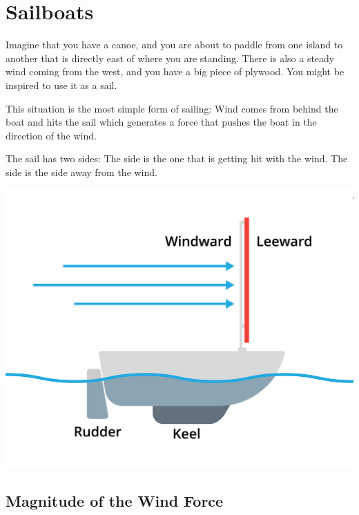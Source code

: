 \chapter{Sailboats}

Imagine that you have a canoe, and you are about to paddle from one island to another that is directly east of where you are standing. There
is also a steady wind coming from the west, and you have a big piece of plywood.  You might be inspired to use it as a sail.

This situation is the most simple form of sailing: Wind comes from behind the boat and hits the sail which generates a force that pushes the
boat in the direction of the wind.

The sail has two sides:  The  side is the one that is getting hit with the wind. The  side is the side away from the wind.
\begin{center}
    \includegraphics[width=.75\textwidth]{plywood.png}

\end{center}

\section{Magnitude of the Wind Force}

